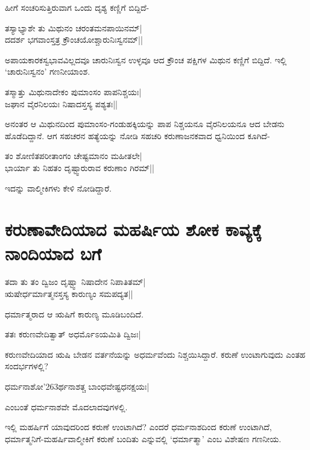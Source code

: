 ಹೀಗೆ ಸಂಚರಿಸುತ್ತಿರುವಾಗ ಒಂದು ದೃಶ್ಯ ಕಣ್ಣಿಗೆ ಬಿದ್ದಿದೆ- 

\begin{shloka} 
ತಸ್ಯಾಭ್ಯಾಶೇ ತು ಮಿಥುನಂ ಚರಂತಮನಪಾಯಿನಮ್‍|\\ 
ದದರ್ಶ ಭಗವಾಂಸ್ತತ್ರ ಕ್ರೌಂಚಯೋಶ್ಚಾರುನಿಃಸ್ವನಮ್‍||
\end{shloka}

ಅಪಾಯಕಾರಕಸ್ವಭಾವವಿಲ್ಲದವೂ ಚಾರುನಿಃಸ್ವನ ಉಳ್ಳವೂ ಆದ ಕ್ರೌಂಚ ಪಕ್ಷಿಗಳ ಮಿಥುನ ಕಣ್ಣಿಗೆ ಬಿದ್ದಿದೆ. ಇಲ್ಲಿ `ಚಾರುನಿಃಸ್ವನಂ' ಗಣನೀಯಾಂಶ. 

\begin{shloka}
ತಸ್ಮಾತ್ತು ಮಿಥುನಾದೇಕಂ ಪುಮಾಂಸಂ ಪಾಪನಿಶ್ಚಯಃ|\\ 
ಜಘಾನ ವೈರನಿಲಯಃ ನಿಷಾದಸ್ತಸ್ಯ ಪಶ್ಯತಃ||
\end{shloka}

ಅನಂತರ ಆ ಮಿಥುನದಿಂದ ಪುಮಾಂಸಂ-ಗಂಡುಹಕ್ಕಿಯನ್ನು ಪಾಪ ನಿಶ್ಚಯನೂ ವೈರನಿಲಯನೂ ಆದ ಬೇಡನು ಹೊಡೆದಿದ್ದಾನೆ. ಆಗ ಸಹಚರನ ಹತ್ಯೆಯನ್ನು ನೋಡಿ ಸಹಚರಿ ಕರುಣಾಜನಕವಾದ ಧ್ವನಿಯಿಂದ ಕೂಗಿದೆ- 

\begin{shloka}
ತಂ ಶೋಣಿತಪರೀತಾಂಗಂ ಚೇಷ್ಟಮಾನಂ ಮಹೀತಲೇ|\\ 
ಭಾರ್ಯಾ ತು ನಿಹತಂ ದೃಷ್ಟ್ವಾರುರಾವ ಕರುಣಾಂ ಗಿರಮ್‍||
\end{shloka}

ಇದನ್ನು ವಾಲ್ಮೀಕಿಗಳು ಕೇಳಿ ನೋಡಿದ್ದಾರೆ. 

\section*{ಕರುಣಾವೇದಿಯಾದ ಮಹರ್ಷಿಯ ಶೋಕ ಕಾವ್ಯಕ್ಕೆ ನಾಂದಿಯಾದ ಬಗೆ} 

\begin{shloka} 
ತದಾ ತು ತಂ ದ್ವಿಜಂ ದೃಷ್ಟ್ವಾ ನಿಷಾದೇನ ನಿಪಾತಿತಮ್‍|\\ 
ಋಷೇರ್ಧರ್ಮಾತ್ಮನಸ್ತಸ್ಯ ಕಾರುಣ್ಯಂ ಸಮಪದ್ಯತ|| 
\end{shloka}

ಧರ್ಮಾತ್ಮರಾದ ಆ ಋಷಿಗೆ ಕಾರುಣ್ಯ ಮೂಡಿಬಂದಿದೆ. 

\begin{shloka} 
ತತಃ ಕರುಣವೇದಿತ್ವಾತ್‍ ಅಧರ್ಮೊಽಯಮಿತಿ ದ್ವಿಜಃ| 
\end{shloka}

ಕರುಣವೇದಿಯಾದ ಋಷಿ ಬೇಡನ ವರ್ತನೆಯನ್ನು ಅಧರ್ಮವೆಂದು ನಿಶ್ಚಯಿಸಿದ್ದಾರೆ. ಕರುಣೆ ಉಂಟಾಗುವುದು ಎಂತಹ ಸಂದರ್ಭಗಳಲ್ಲಿ? 

\begin{shloka}
ಧರ್ಮನಾಶೋ\char'263ರ್ಥನಾಶತ್ಚ ಬಾಂಧವೇಷ್ಟಧನಕ್ಷಯಃ|
\end{shloka}
ಎಂಬಂತೆ ಧರ್ಮನಾಶವೇ ಮೊದಲಾದವುಗಳಲ್ಲಿ. 

ಇಲ್ಲಿ ಮಹರ್ಷಿಗೆ ಯಾವುದರಿಂದ ಕರುಣೆ ಉಂಟಾಗಿದೆ? ಎಂದರೆ ಧರ್ಮನಾಶದಿಂದ ಕರುಣೆ ಉಂಟಾಗಿದೆ, ಧರ್ಮಾತ್ಮನಿಗೆ-ಮಹರ್ಷಿವಾಲ್ಮೀಕಿಗೆ ಕರುಣೆ ಬಂದಿತು ಎನ್ನುವಲ್ಲಿ `ಧರ್ಮಾತ್ಮಾ' ಎಂಬ ವಿಶೇಷಣ ಗಣನೀಯ. 

